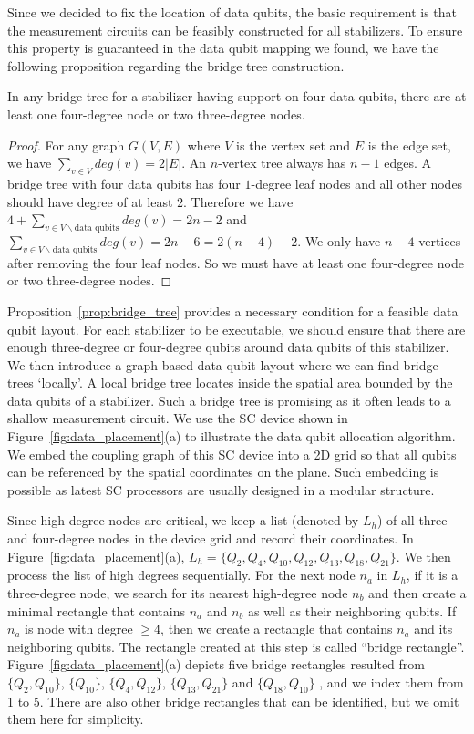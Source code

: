 Since we decided to fix the location of data qubits, the basic requirement is that the measurement circuits can be feasibly constructed for all stabilizers. 
To ensure this property is guaranteed in the data qubit mapping we found, we have the following proposition regarding the bridge tree construction.
\begin{prop}\label{prop:bridge_tree}
In any bridge tree for a stabilizer having support on four data qubits, there are at least one four-degree node or two three-degree nodes.
\end{prop}
\begin{proof}
For any graph $G(V,E)$ where $V$ is the vertex set and $E$ is the edge set, we have $\sum_{v\in V}deg(v) = 2|E|$. An $n$-vertex tree always has $n-1$ edges. A bridge tree with four data qubits has four $1$-degree leaf nodes and all other nodes should have degree of at least $2$. Therefore we have $4 + \sum_{v\in V\backslash \text{data qubits}} deg(v) = 2n-2$ and $\sum_{v\in V\backslash \text{data qubits}} deg(v) = 2n-6 = 2(n-4) + 2$. We only have $n-4$ vertices after removing the four leaf nodes. So we must have at least one four-degree node or two three-degree nodes.
\end{proof}

Proposition~\ref{prop:bridge_tree} provides a necessary condition for a feasible data qubit layout. For each stabilizer to be executable, we should ensure that there are enough three-degree or four-degree qubits around data qubits of this stabilizer. We then introduce a graph-based data qubit layout where we can find bridge trees `locally'. A local bridge tree locates inside the spatial area bounded by the data qubits of a stabilizer. Such a bridge tree is promising as it often leads to a shallow  measurement circuit.
We use the SC device shown in Figure~\ref{fig:data_placement}(a) to illustrate the data qubit allocation algorithm. 
We embed the coupling graph of this SC device into a 2D grid so that all qubits can be referenced by the spatial coordinates on the plane.
Such embedding is possible as latest SC processors are usually designed in a modular structure.

Since high-degree nodes are critical, we %
keep a list (denoted by $L_h$) of all three- and four-degree nodes in the device grid and record their coordinates. 
In Figure~\ref{fig:data_placement}(a), $L_h = \{ Q_{2}, Q_{4}, Q_{10}, Q_{12}, Q_{13}, Q_{18}, Q_{21} \}$. 
We then process the list of high degrees sequentially.
For the next %
node $n_a$ in $L_h$, if it is a three-degree node, we search for its nearest high-degree node $n_b$ and then create a minimal rectangle that contains $n_a$ and $n_b$ as well as their neighboring qubits.  If $n_a$ is node with degree $\ge 4$, then we create a rectangle that contains $n_a$ and its neighboring qubits. The rectangle created at this step is called ``bridge rectangle''. 
Figure~\ref{fig:data_placement}(a) depicts five bridge rectangles resulted from $\{Q_2, Q_{10}\}$, $\{ Q_{10} \}$, $\{Q_4, Q_{12}\}$, $\{Q_{13}, Q_{21}\}$ and $\{Q_{18}, Q_{10}\}$ , and we index them from 1 to 5. There are also other bridge rectangles that can be identified, but we omit them here for simplicity.



